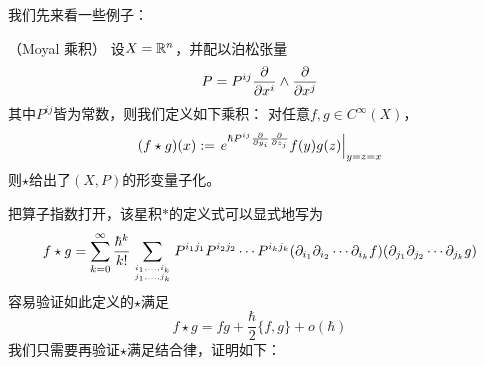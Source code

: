 


我们先来看一些例子：


\begin{Example}（Moyal 乘积）
设$X=\mathbb{R}^n$，并配以泊松张量
$$P=P^{ij}\frac{\partial } {\partial x^i}\wedge\frac{\partial } {\partial x^j}$$
其中$P^{ij}$皆为常数，则我们定义如下乘积：
对任意$f,g\in C^{\infty}(X)$，
$$(f\star g)(x):=
  \left.
    e^{
        \hbar P^{ij}
        \frac{\partial}{\partial y_i}
        \frac{\partial}{\partial z_j}
      }
    f(y)g(z)
  \right|_{y=z=x}$$
则$\star$给出了$(X,P)$的形变量子化。
\label{Moyal星积-def}
\end{Example}
把算子指数打开，该星积$*$的定义式可以显式地写为
$$
  f\star g
=
  \sum_{k=0}^{\infty}
    \frac{\hbar^k}{k!}
    \sum_{i_1,...,i_k
          \atop
          j_1,...,j_k
         }
      P^{i_1j_1}P^{i_2j_2}\cdots P^{i_kj_k}
      (\partial_{i_1}\partial_{i_2}\cdots\partial_{i_k}f)
      (\partial_{j_1}\partial_{j_2}\cdots\partial_{j_k}g)
$$
容易验证如此定义的$\star$满足
$$f\star g=fg+\frac{\hbar}{2}\{f,g\}+o(\hbar)$$
我们只需要再验证$\star$满足结合律，证明如下：

